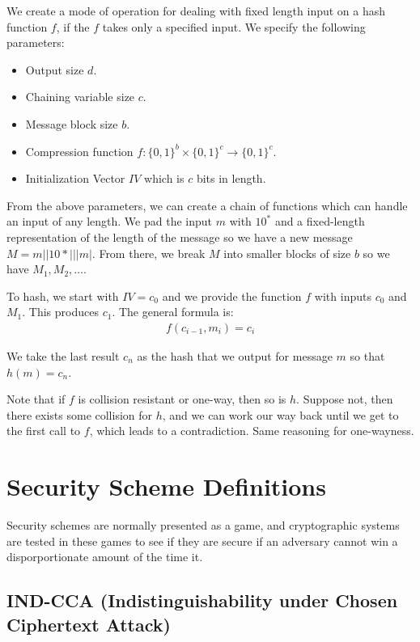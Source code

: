 \documentclass[psamsfonts]{amsart}
\begin{document}
We create a mode of operation for dealing with fixed length input on a hash function $f$, if the $f$ takes only a specified input. We specify the following parameters:
\begin{itemize}
  \item Output size $d$.
  \item Chaining variable size $c$.
  \item Message block size $b$.
  \item Compression function $f: \{0,1\}^b \times \{0,1\}^c \to \{0,1\}^{c}$.
  \item Initialization Vector $IV$ which is $c$ bits in length.
\end{itemize}

From the above parameters, we can create a chain of functions which can handle an input of any length. We pad the input $m$ with $10^*$ and a fixed-length representation of the length of the message so we have a new message $M = m || 10* || |m|$. From there, we break $M$ into smaller blocks of size $b$ so we have $M_1, M_2, \ldots$.

To hash, we start with $IV = c_0$ and we provide the function $f$ with inputs $c_0$ and $M_1$. This produces $c_1$. The general formula is:
\begin{eqnarray}
  f(c_{i-1}, m_i) = c_i
\end{eqnarray}

We take the last result $c_n$ as the hash that we output for message $m$ so that $h(m) = c_n$.

Note that if $f$ is collision resistant or one-way, then so is $h$. Suppose not, then there exists some collision for $h$, and we can work our way back until we get to the first call to $f$, which leads to a contradiction. Same reasoning for one-wayness.

\newpage

\section{Security Scheme Definitions}

Security schemes are normally presented as a game, and cryptographic systems are tested in these games to see if they are secure if an adversary cannot win a disporportionate amount of the time it.

\subsection{IND-CCA (Indistinguishability under Chosen Ciphertext Attack)}
\end{document}
